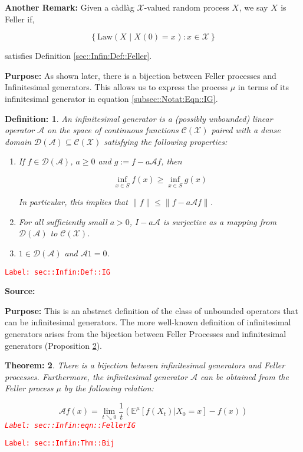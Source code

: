 \documentclass[12pt]{article}
\newcommand{\mb}{\mathbb}
\newcommand{\mc}{\mathcal}
\newcommand{\te}{\text}
\newcommand{\tr}{\textcolor{red}}
\newcommand{\labe}[1]{\tr{\texttt{Label: #1}}}
\newcommand{\purpose}{\textbf{Purpose: }}
\newcommand{\IG}{\mc{A}}						%
\newcommand{\law}{\te{Law}}							%
\newcommand{\rxvt}[2]{X_{#1}{(#2)}}					%
\newcommand{\xvts}[2]{x_{#1}{#2}}					%
\newcommand{\rxvts}[2]{X_{#1}{#2}}					%
\newtheorem{thms}{Theorem: }[section]
\newtheorem{defn}[thms]{Definition: }
\begin{document}
\textbf{Another Remark: } Given a c\`adl\`ag \(\mc{X}\)-valued random process \(\rxvts{}{}\), we say \(\rxvts{}{}\) is Feller if,

\[\left\{\law\left(\rxvts{}{}\middle|\rxvt{}{0} = \xvts{}{}\right): \xvts{}{} \in \mc{X}\right\}\]

satisfies Definition \ref{sec::Infin:Def::Feller}.

\purpose As shown later, there is a bijection between Feller processes and Infinitesimal generators. This allows us to express the process \(\mu\) in terms of its infinitesimal generator in equation \eqref{subsec::Notat:Eqn::IG}.

\begin{defn}
An infinitesimal generator is a (possibly unbounded) linear operator \(\IG{}\) on the space of continuous functions \(\mc{C}(\mc{X})\) paired with a dense domain \(\mc{D}(\IG{}) \subseteq \mc{C}(\mc{X})\) satisfying the following properties:

\begin{enumerate}
\item If \(f \in \mc{D}(\IG{})\), \(a \geq 0\) and \(g:= f - a\IG{} f\), then 

\[\inf_{x \in S} f(x) \geq \inf_{x \in S} g(x)\]

\noindent In particular, this implies that \(\|f\| \leq \|f - a\IG{} f\|\).

\item For all sufficiently small \(a > 0\), \(I - a\IG{}\) is surjective as a mapping from \(\mc{D}(\IG{})\) to \(\mc{C}(\mc{X})\).

\item \(1 \in \mc{D}(\IG{})\) and \(\IG{} 1 = 0\).
\end{enumerate}
\label{sec::Infin:Def::IG}
\end{defn}
\labe{sec::Infin:Def::IG}

\textbf{Source: }\cite[Definitions 2.1,2.7]{Lig85}

\purpose This is an abstract definition of the class of unbounded operators that can be infinitesimal generators. The more well-known definition of infinitesimal generators arises from the bijection between Feller Processes and infinitesimal generators (Proposition \ref{sec::Infin:Thm::Bij}).

\begin{thms}
There is a bijection between infinitesimal generators and Feller processes. Furthermore, the infinitesimal generator \(\IG{}\) can be obtained from the Feller process \(\mu\) by the following relation:

\begin{equation}
\mc{A}f(x) = \lim_{t\searrow 0} \frac{1}{t}\left(\mb{E}^\mu[f(X_t)|X_0=x] - f(x)\right)
\label{sec::Infin:eqn::FellerIG}
\end{equation}
\labe{sec::Infin:eqn::FellerIG}
\label{sec::Infin:Thm::Bij}
\end{thms}
\labe{sec::Infin:Thm::Bij}
\end{document}
